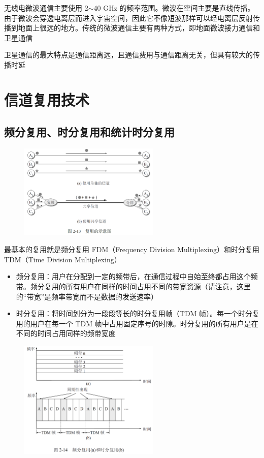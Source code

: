 \documentclass[cs4size,a4paper,10pt]{ctexart}
\begin{document}
	无线电微波通信主要使用 2$\sim$40 GHz 的频率范围。微波在空间主要是直线传播。由于微波会穿透电离层而进入宇宙空间，因此它不像短波那样可以经电离层反射传播到地面上很远的地方。传统的微波通信主要有两种方式，即地面微波接力通信和卫星通信

	卫星通信的最大特点是通信距离远，且通信费用与通信距离无关，但具有较大的传播时延

	\section{信道复用技术}

	\subsection{频分复用、时分复用和统计时分复用}

	\begin{figure}[H]
		\centering
		\includegraphics[width=0.6\textwidth]{img/2.13}
	\end{figure}

	最基本的复用就是频分复用 FDM（Frequency Division Multiplexing）和时分复用 TDM（Time Division Multiplexing）
	\begin{itemize}
		\item 频分复用：用户在分配到一定的频带后，在通信过程中自始至终都占用这个频带。频分复用的所有用户在同样的时间占用不同的带宽资源（请注意，这里的“带宽”是频率带宽而不是数据的发送速率）
		\item 时分复用：将时间划分为一段段等长的时分复用帧（TDM 帧）。每一个时分复用的用户在每一个 TDM 帧中占用固定序号的时隙。时分复用的所有用户是在不同的时间占用同样的频带宽度
	\end{itemize}

	\begin{figure}[H]
		\centering
		\includegraphics[width=0.6\textwidth]{img/2.14}
	\end{figure}
\end{document}
